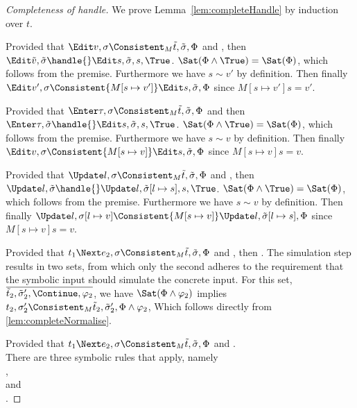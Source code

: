 \begin{proof}[Completeness of handle]
  We prove Lemma~\ref{lem:completeHandle} by induction over $t$.\\

    {
    Provided that $\Edit v,\sigma\Consistent_{M}\tilde{t},\tilde{\sigma},\Phi$ and ,
    then $\Edit\tilde{v},\tilde{\sigma}\handle{}\Edit s,\tilde{\sigma},s,\True$.
    $\Sat(\Phi\land\True)=\Sat(\Phi)$, which follows from the premise.
    Furthermore we have $s\sim v'$ by definition.
    Then finally $\Edit v',\sigma\Consistent{M[s\mapsto v']}\Edit s,\tilde{\sigma},\Phi$ since $M[s\mapsto v'] s = v'$.


    }

    {
    Provided that $\Enter \tau,\sigma\Consistent_{M}\tilde{t},\tilde{\sigma},\Phi$ and 
    then $\Enter\tau,\tilde{\sigma}\handle{}\Edit s,\tilde{\sigma},s,\True$.
    $\Sat(\Phi\land\True)=\Sat(\Phi)$, which follows from the premise.
    Furthermore we have $s\sim v$ by definition.
    Then finally $\Edit v,\sigma\Consistent{M[s\mapsto v]}\Edit s,\tilde{\sigma},\Phi$ since $M[s\mapsto v] s = v$.
    }

    {
    Provided that $\Update l,\sigma\Consistent_{M}\tilde{t},\tilde{\sigma},\Phi$ and ,
    then $\Update l,\tilde{\sigma}\handle{}\Update l,\tilde{\sigma}[l\mapsto s],s,\True$.
    $\Sat(\Phi\land\True)=\Sat(\Phi)$, which follows from the premise.
    Furthermore we have $s\sim v$ by definition.
    Then finally $\Update l,\sigma[l\mapsto v]\Consistent{M[s\mapsto v]}\Update l,\tilde{\sigma}[l\mapsto s],\Phi$ since $M[s\mapsto v] s = v$.
     }

    {
      {
      Provided that $t_1\Next e_2,\sigma\Consistent_{M}\tilde{t},\tilde{\sigma},\Phi$ and ,
      then .
      The simulation step results in two sets, from which only the second adheres to the requirement that the symbolic input should simulate the concrete input.
      For this set, $\overline{\tilde{t}_2,\tilde{\sigma}_2',\Continue,\phi_2}$, we have $\Sat(\Phi\land\phi_2)$ implies
      $t_2,\sigma_2'\Consistent_M\tilde{t}_2,\tilde{\sigma}_2',\Phi\land\phi_2$,
      Which follows directly from \cref{lem:completeNormalise}.
      }
      {
      Provided that $t_1\Next e_2,\sigma\Consistent_{M}\tilde{t},\tilde{\sigma},\Phi$ and .\\
      There are three symbolic rules that apply, namely\\
      ,\\
       and\\
      .

}}
\end{proof}
